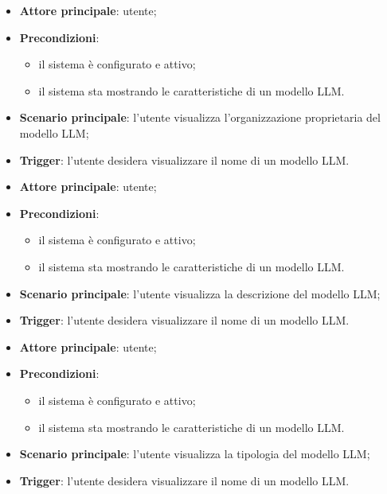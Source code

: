 \documentclass[10pt, a4paper]{article}
\begin{document}
    \begin{itemize}
        \item \textbf{Attore principale}: utente;
        \item \textbf{Precondizioni}:
            \begin{itemize}
                \item il sistema è configurato e attivo;
                \item il sistema sta mostrando le caratteristiche di un modello LLM.
            \end{itemize}
        \item \textbf{Scenario principale}: l'utente visualizza l'organizzazione proprietaria del modello LLM;
        \item \textbf{Trigger}: l’utente desidera visualizzare il nome di un modello LLM.
    \end{itemize}

    \begin{itemize}
        \item \textbf{Attore principale}: utente;
        \item \textbf{Precondizioni}:
            \begin{itemize}
                \item il sistema è configurato e attivo;
                \item il sistema sta mostrando le caratteristiche di un modello LLM.
            \end{itemize}
        \item \textbf{Scenario principale}: l'utente visualizza la descrizione del modello LLM;
        \item \textbf{Trigger}: l’utente desidera visualizzare il nome di un modello LLM.
    \end{itemize}

    \begin{itemize}
        \item \textbf{Attore principale}: utente;
        \item \textbf{Precondizioni}:
            \begin{itemize}
                \item il sistema è configurato e attivo;
                \item il sistema sta mostrando le caratteristiche di un modello LLM.
            \end{itemize}
        \item \textbf{Scenario principale}: l'utente visualizza la tipologia del modello LLM;
        \item \textbf{Trigger}: l’utente desidera visualizzare il nome di un modello LLM.
    \end{itemize}
\end{document}
